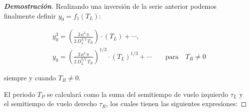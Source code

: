 \documentclass[12pt,a4paper]{report} %
\begin{document}
\begin{proof}[\textbf{Demostración}]
	\noindent Realizando una inversión de la serie  anterior podemos finalmente definir $y_0=f_1(T_L)$:
	
	\begin{equation}
		\label{eq:macla4}
		\begin{aligned}
		&y_0^3= \left( \frac{3\, a^3 \, \pi}{2\, D_L^{3/2}\, T_R} \right)\cdot \left(T_L\right)+\cdots,\\[3mm]
		&y_0= \left( \frac{3\, a^3 \, \pi}{2\, D_L^{3/2}\, T_R} \right)^{1/3}\cdot \left(T_L\right)^{1/3}+\cdots \qquad \text{para} \quad T_R \neq 0
	\end{aligned}
	\end{equation}
	
	\vspace{0.5cm}\noindent siempre y cuando $T_R\neq0$.
	

	\vspace{0.5cm} El periodo $T_P$ se calculará como la suma del semitiempo de vuelo izquierdo $\tau_L$ y el semitiempo de vuelo derecho $\tau_R$, los cuales tienen las siguientes expresiones:
		

\end{proof}
\end{document}
